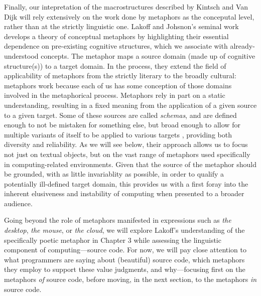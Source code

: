 Finally, our intepretation of the macrostructures described by Kintsch and Van Dijk will rely extensively on the work done by metaphors as the conceputal level, rather than at the strictly linguistic one. Lakoff and Johsnon's seminal work develops a theory of conceptual metaphors by highlighting their essential dependence on pre-existing cognitive structures, which we associate with already-understood concepts. The metaphor maps a source domain (made up of cognitive structure(s)) to a target domain. In the process, they extend the field of applicability of metaphors from the strictly literary to the broadly cultural: metaphors work because each of us has some conception of those domains involved in the metaphorical process. Metaphors rely in part on a static understanding, resulting in a fixed meaning from the application of a given source to a given target. Some of these sources are called \emph{schemas}, and are defined enough to not be mistaken for something else, but broad enough to allow for multiple variants of itself to be applied to various targets \citep{lakoff_metaphors_1980}, providing both diversity and reliability. As we will see below, their approach allows us to focus not just on textual objects, but on the vast range of metaphors used specifically in computing-related environments. Given that the source of the metaphor should be grounded, with as little invariablity as possible, in order to qualify a potentially ill-defined target domain, this provides us with a first foray into the inherent elusiveness and instability of computing when presented to a broader audience.

Going beyond the role of metaphors manifested in expressions such as \emph{the desktop}, \emph{the mouse}, or \emph{the cloud}, we will explore Lakoff's understanding of the specifically poetic metaphor in Chapter 3 while assessing the linguistic component of computing—source code. For now, we will pay close attention to what programmers are saying about (beautiful) source code, which metaphors they employ to support these value judgments, and why—focusing first on the metaphors \emph{of} source code, before moving, in the next section, to the metaphors \emph{in} source code.

